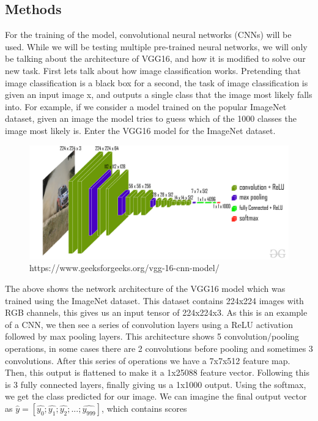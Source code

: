 \documentclass[12pt]{article}
\begin{document}
\subsection*{Methods}
\quad
For the training of the model, convolutional neural networks (CNNs) will be used. While we will be testing multiple pre-trained neural networks, we will only be talking about the architecture of VGG16, and how
it is modified to solve our new task. First lets talk about how image classification works. Pretending that image classification is a black box for a second, the task of image classification is given
an input image x, and outputs a single class that the image most likely falls into. For example, if we consider a model trained on the popular ImageNet dataset, given an image the model tries to guess which of the
1000 classes the image most likely is. Enter the VGG16 model for the ImageNet dataset. \\
\begin{figure}[H]
    \centering
    \includegraphics[scale=0.25]{images/vgg-architechture.jpg}\\
    https://www.geeksforgeeks.org/vgg-16-cnn-model/
\end{figure}
The above shows the network architecture of the VGG16 model which was trained using the ImageNet dataset. This dataset contains 224x224 images with RGB channels, this gives us an input tensor of 224x224x3.
As this is an example of a CNN, we then see a series of convolution layers using a ReLU activation followed by max pooling layers. This architecture shows 5 convolution/pooling operations, in some cases there are 2 convolutions before 
pooling and sometimes 3 convolutions. After this series of operations we have a 7x7x512 feature map. Then, this output is flattened to make it a 1x25088 feature vector. Following this is 3 
fully connected layers, finally giving us a 1x1000 output. Using the softmax, we get the class predicted for our image. We can imagine the final output vector as $\hat{y} = [\hat{y_0}; \hat{y_1}; \hat{y_2}; ... ; \hat{y_{999}}]$, which contains scores
\end{document}
